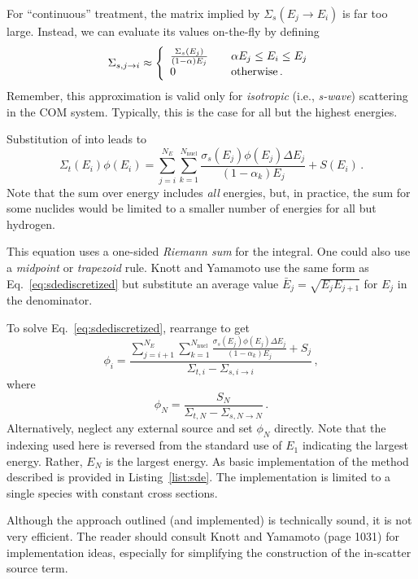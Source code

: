 For ``continuous'' treatment, the matrix implied by 
$\Sigma_s (E_j \to E_i)$ is far too large.  Instead,
we can evaluate its values on-the-fly by defining
\begin{equation}
      \Sigma_{s,j\to i} \approx 
        \left\{
           \begin{array}{l l}
               \frac{\Sigma_s(E_j)}{(1-\alpha)E_j} & \quad \alpha E_j \leq E_i \leq E_j \\
               0                                   & \quad \text{otherwise} \, .
            \end{array} 
        \right.
\label{eq:scattermatrixappx}
\end{equation}
Remember, this approximation is valid only for \emph{isotropic} 
(i.e., \emph{s-wave}) scattering in the COM system.  Typically, this is the 
case for all but the highest energies.
    
Substitution of  into 
leads to
\begin{equation}
     \Sigma_t (E_i) \phi(E_i) = 
       \sum_{j=i}^{N_E} \sum^{N_{\text{nucl}}}_{k=1} \frac{\sigma_s (E_j) \phi(E_j) \Delta E_j }{(1-\alpha_k)E_j} 
         + S(E_i) \, .
\label{eq:sdediscretized}
\end{equation}
Note that the sum over energy includes \emph{all} energies, but, in practice, the sum for 
some nuclides would be limited to a smaller number of energies for all 
but hydrogen.
        
This equation uses a one-sided \emph{Riemann sum} for the integral.  One
could also use a \emph{midpoint} or \emph{trapezoid} rule.  Knott and 
Yamamoto use the same form as Eq.~\ref{eq:sdediscretized} but substitute an average 
value $\bar{E}_j = \sqrt{E_j E_{j+1}}$ for $E_j$ in the 
denominator.
    
To solve Eq.~\ref{eq:sdediscretized}, rearrange to get
\begin{equation}
      \phi_i =
      \frac{ 
         \sum\limits_{j=i+1}^{N_E} 
         \sum\limits^{N_{\text{nucl}}}_{k=1} \frac{\sigma_s (E_j) \phi(E_j) \Delta E_j }{(1-\alpha_k)E_j} + S_j}
          {\Sigma_{t, i} - \Sigma_{s, i\to i}} \, ,
\end{equation}
where 
\begin{equation}
     \phi_N = \frac{S_N}{\Sigma_{t,N}-\Sigma_{s,N\to N}} \, .
\end{equation}
Alternatively, neglect any external source and set $\phi_N$ directly.
Note that the indexing used here is reversed from the standard 
use of $E_1$ indicating the largest energy.  Rather, $E_N$ is
the largest energy.
As basic implementation of the method described is provided in 
Listing~\ref{list:sde}.  The implementation is limited to 
a single species with constant cross sections.   

Although the approach outlined (and implemented) is technically sound, it is not 
very efficient.  The reader should consult Knott and Yamamoto (page 1031) 
for implementation ideas, especially for simplifying the construction 
of the in-scatter source term.   
    
